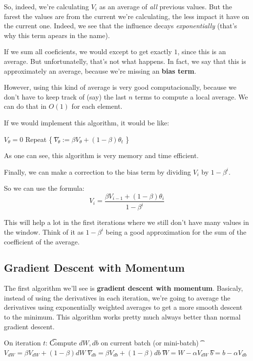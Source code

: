 \documentclass[12pt, a4paper, oneside]{book}
\begin{document}
So, indeed, we're calculating $V_i$ as an average of \textit{all} previous
values. But the farest the values are from the current we're calculating, the
less impact it have on the current one. Indeed, we see that the influence decays
\textit{exponentially} (that's why this term apears in the name).

If we sum all coeficients, we would except to get exactly $1$, since this is an
average. But unfortunatelly, that's not what happens. In fact, we say that this
is approximately an average, because we're missing an \textbf{bias term}.

However, using this kind of average is very good computacionally, because we
don't have to keep track of (say) the last $n$ terms to compute a local average.
We can do that in $O(1)$ for each element.

If we would implement this algorithm, it would be like:

\begin{algorithm}
$V_\theta = 0$ \nl
Repeat \{ \nl
\t $V_\theta := \beta V_\theta + (1-\beta)\theta_t$ \nl
\}
\end{algorithm}

As one can see, this algorithm is very memory and time efficient.

Finally, we can make a correction to the bias term by dividing $V_i$ by
$1-\beta^{i}$.

So we can use the formula:
\[
    V_i = \dfrac{\beta V_{i-1} + (1-\beta)\theta_i}{1-\beta^{i}}
\]

This will help a lot in the first iterations where we still don't have many
values in the window. Think of it as $1-\beta^{i}$ being a good approximation
for the sum of the coefficient of the average.

\subsection{Gradient Descent with Momentum}%
\label{sub:gradient_descent_with_momentum}

The first algorithm we'll see is \textbf{gradient descent with momentum}.
Basicaly, instead of using the derivatives in each iteration, we're going to
average the derivatives using exponentially weighted averages to get a more
smooth descent to the minimum. This algorithm works pretty much always better
than normal gradient descent.

\begin{algorithm}
On iteration $t$: \nl
\t Compute $dW, db$ on current batch (or mini-batch) \nl
\t $V_{dW}=\beta V_{dW} + (1-\beta)dW$ \nl
\t $V_{db}=\beta V_{db} + (1-\beta)db$ \nl
\t $W=W-\alpha V_{dW}$ \nl
\t $b=b-\alpha V_{db}$ \nl
\end{algorithm}
\end{document}
